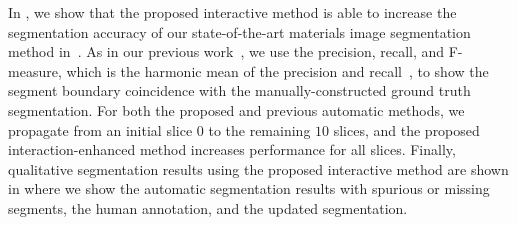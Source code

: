 \documentclass[]{spie}  %
\begin{document}
In , we show that the proposed interactive method is able
to increase the segmentation accuracy of our state-of-the-art
materials image segmentation method in~\cite{waggoner:11}.  As in our
previous work~\cite{waggoner:11}, we use the precision, recall, and
F-measure, which is the harmonic mean of the precision and
recall~\cite{martin:01}, to show the segment boundary coincidence with
the manually-constructed ground truth segmentation.  For both the
proposed and previous automatic methods, we propagate from an initial
slice $0$ to the remaining $10$ slices, and the proposed
interaction-enhanced method increases performance for all slices.
Finally, qualitative segmentation results using the proposed
interactive method are shown in  where we show the automatic
segmentation results with spurious or missing segments, the human
annotation, and the updated segmentation.
\end{document}
